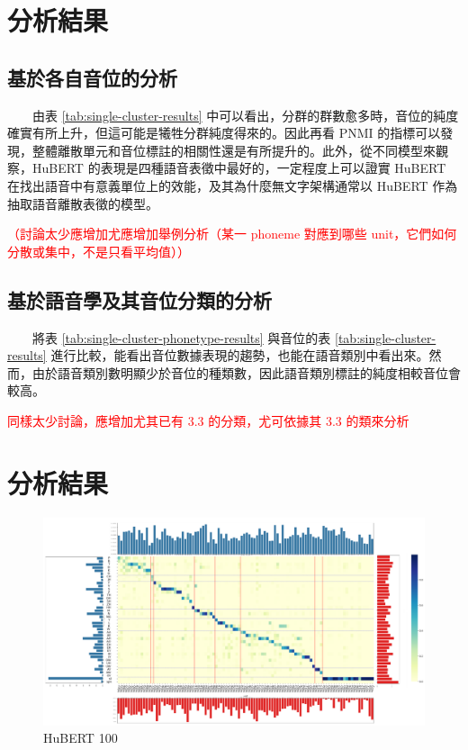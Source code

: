 
\section{分析結果}

\subsection{基於各自音位的分析}



　　由表 \ref{tab:single-cluster-results} 中可以看出，分群的群數愈多時，音位的純度確實有所上升，但這可能是犧牲分群純度得來的。因此再看 PNMI 的指標可以發現，整體離散單元和音位標註的相關性還是有所提升的。此外，從不同模型來觀察，HuBERT 的表現是四種語音表徵中最好的，一定程度上可以證實 HuBERT 在找出語音中有意義單位上的效能，及其為什麼無文字架構通常以 HuBERT 作為抽取語音離散表徵的模型。

\textcolor{red}{（討論太少應增加尤應增加舉例分析（某一 phoneme 對應到哪些 unit，它們如何分散或集中，不是只看平均值））}

\subsection{基於語音學及其音位分類的分析}



　　將表 \ref{tab:single-cluster-phonetype-results} 與音位的表 \ref{tab:single-cluster-results} 進行比較，能看出音位數據表現的趨勢，也能在語音類別中看出來。然而，由於語音類別數明顯少於音位的種類數，因此語音類別標註的純度相較音位會較高。

\textcolor{red}{同樣太少討論，應增加尤其已有 3.3 的分類，尤可依據其 3.3 的類來分析}

\setcounter{section}{4}


\section{分析結果}

\begin{figure}
    \centering
    \includegraphics[width=1\linewidth]{figures/better__p_ph_given_un.png}
    \caption{HuBERT 100}
    \label{p_p_given_u-hub-100}
\end{figure}

